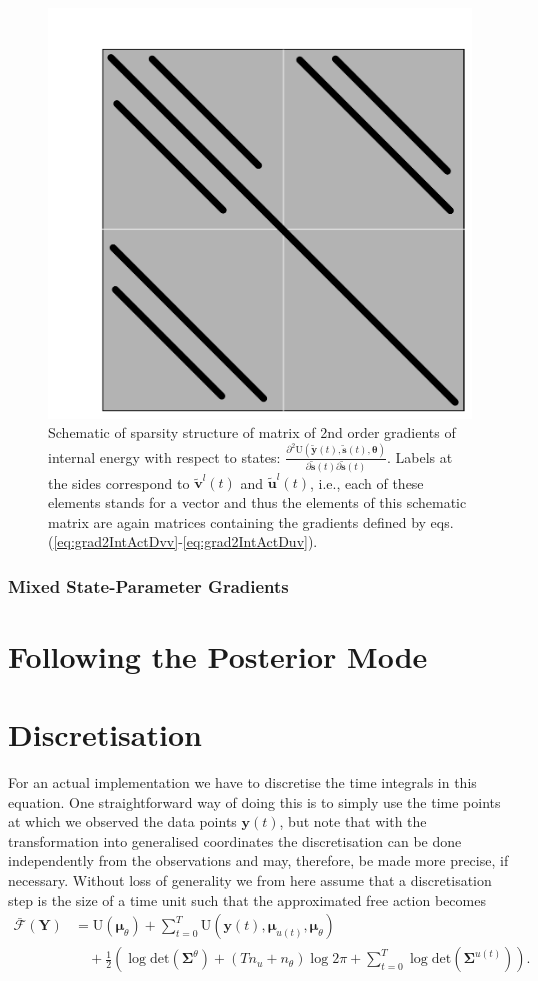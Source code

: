 \documentclass[a4paper,10pt]{article}
\newcommand{\bs}[1]{\mathbf{#1}}					%
\newcommand{\bgs}[1]{\boldsymbol{#1}}				%
\newcommand{\ppd}[3]{\frac{\partial^2 #1}{\partial #2 \partial #3}} %
\newcommand{\gc}[1]{\tilde{#1}} %
\renewcommand{\ss}{u}         %
\newcommand{\sv}{v}         %
\newcommand{\so}{y}         %
\newcommand{\st}{s}         %
\renewcommand{\sp}{\theta}    %
\newcommand{\ps}{\bs{\ss}}    %
\newcommand{\pv}{\bs{\sv}}    %
\newcommand{\po}{\bs{\so}}    %
\newcommand{\pt}{\bs{\st}}     %
\newcommand{\psg}{\gc{\ps}}    %
\newcommand{\pvg}{\gc{\pv}}    %
\newcommand{\ptg}{\gc{\pt}}     %
\newcommand{\pog}{\gc{\po}}    %
\newcommand{\pp}{\bgs{\sp}} %
\newcommand{\Po}{\bs{Y}}    %
\newcommand{\U}{\mathrm{U}}			%
\newcommand{\Fa}{\bar{\mathcal{F}}}		%
\newcommand{\Cov}{\bgs{\Sigma}}			%
\renewcommand{\det}[1]{\mathrm{det}(#1)}	%
\begin{document}
\begin{figure}
    \centering
    \includegraphics[width=.5\textwidth]{stateGradientsSparseMatrix.pdf}
    \caption{Schematic of sparsity structure of matrix of 2nd order gradients of internal energy with respect to states: $\ppd{\U(\pog(t),\ptg(t),\pp)}{\ptg(t)}{\ptg(t)}$. Labels at the sides correspond to $\pvg^l(t)$ and $\psg^l(t)$, i.e., each of these elements stands for a vector and thus the elements of this schematic matrix are again matrices containing the gradients defined by eqs. (\ref{eq:grad2IntActDvv}-\ref{eq:grad2IntActDuv}).}
    \label{fig:stateGrads}
\end{figure}


\subsubsection{Mixed State-Parameter Gradients}



\section{Following the Posterior Mode}



\section{Discretisation}
For an actual implementation we have to discretise the time integrals in this equation. One straightforward way of doing this is to simply use the time points at which we observed the data points $\po(t)$, but note that with the transformation into generalised coordinates the discretisation can be done independently from the observations and may, therefore, be made more precise, if necessary. Without loss of generality we from here assume that a discretisation step is the size of a time unit such that the approximated free action becomes
\begin{align}
    \Fa(\Po) &= \label{eq:approxFreeActionDisc} \U(\bgs{\mu}_\sp) + \sum_{t=0}^T  \U(\po(t),\bgs{\mu}_{\ss(t)},\bgs{\mu}_\sp) \nonumber\\
    &\quad + \frac{1}{2} \left(\log \det{\Cov^\sp} + (Tn_\ss + n_{\sp}) \log 2\pi + \sum_{t=0}^T \log \det{\Cov^{\ss(t)}}\right).
\end{align}




\end{document}
